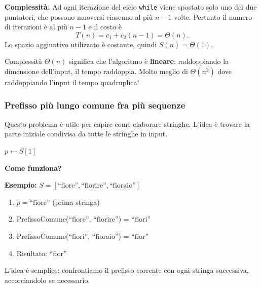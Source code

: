 \documentclass[a4paper, 11pt]{article}
\theoremstyle{definition}
\theoremstyle{remark}
\theoremstyle{remark}
\newenvironment{nota}{%
	\begin{tcolorbox}[
		colback=codebg,
		colframe=primary,
		fonttitle=\bfseries,
		title=Nota,
		left=6pt, right=6pt, top=4pt, bottom=4pt
		]
	}{%
	\end{tcolorbox}
}
\begin{document}
	\textbf{Complessità.}
	Ad ogni iterazione del ciclo \texttt{while} viene spostato
	solo uno dei due puntatori, che possono muoversi ciascuno al più $n-1$ volte.
	Pertanto il numero di iterazioni è al più $n-1$ e il costo è
	\[
	T(n) = c_1 + c_2 (n-1) = \Theta(n).
	\]
	Lo spazio aggiuntivo utilizzato è costante, quindi $S(n) = \Theta(1)$.
	
	\begin{nota}
		Complessità $\Theta(n)$ significa che l'algoritmo è \textbf{lineare}: raddoppiando la dimensione dell'input, il tempo raddoppia. Molto meglio di $\Theta(n^2)$ dove raddoppiando l'input il tempo quadruplica!
	\end{nota}
	
	\pagebreak
	\subsubsection*{Prefisso più lungo comune fra più sequenze}
	
	\begin{softnote}
		Questo problema è utile per capire come elaborare stringhe. L'idea è trovare la parte iniziale condivisa da tutte le stringhe in input.
	\end{softnote}
	
	\begin{algorithm}[H]
		\caption{Prefisso comune più lungo}
		\label{alg:prefisso-comune}
		
		
		
		$p \gets S[1]$
		
		
	\end{algorithm}
	
	\begin{softnote}
		\textbf{Come funziona?}
		
		\textbf{Esempio:} $S = [\text{``fiore''}, \text{``fiorire''}, \text{``fioraio''}]$
		\begin{enumerate}
			\item $p = \text{``fiore''}$ (prima stringa)
			\item PrefissoComune($\text{``fiore''}$, $\text{``fiorire''}$) = $\text{``fiori''}$
			\item PrefissoComune($\text{``fiori''}$, $\text{``fioraio''}$) = $\text{``fior''}$
			\item Risultato: $\text{``fior''}$
		\end{enumerate}
		
		L'idea è semplice: confrontiamo il prefisso corrente con ogni stringa successiva, accorciandolo se necessario.
	\end{softnote}
	
\end{document}
